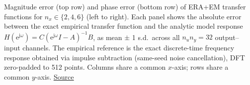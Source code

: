 Magnitude error (top row) and phase error (bottom row) of ERA+EM transfer functions for $n_x \in \{2, 4, 6\}$ (left to right). Each panel shows the absolute error between the exact empirical transfer function and the analytic model response $H(\mathrm{e}^{\mathrm{j}\omega}) = C(\mathrm{e}^{\mathrm{j}\omega}I - A)^{-1}B$, as mean $\pm$ 1 s.d.\ across all $n_u n_y = 32$ output--input channels. The empirical reference is the exact discrete-time frequency response obtained via impulse subtraction (same-seed noise cancellation), DFT zero-padded to 512 points. Columns share a common $x$-axis; rows share a common $y$-axis. \href{https://github.com/tahmidazam/gg4/blob/main/notebooks/bode/bode.ipynb}{\underline{Source}}%